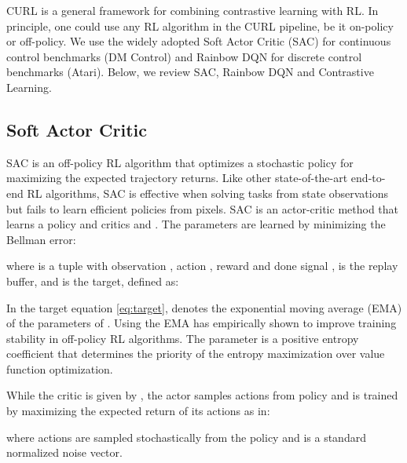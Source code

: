 \documentclass{article}
\begin{document}
CURL is a general framework for combining contrastive learning with RL. In principle, one could use any RL algorithm in the CURL pipeline, be it on-policy or off-policy. We use the widely adopted Soft Actor Critic (SAC) \cite{haarnoja2018soft} for continuous control benchmarks (DM Control) and Rainbow DQN \cite{hessel2017rainbow, van2019use} for discrete control benchmarks (Atari). Below, we review SAC, Rainbow DQN and Contrastive Learning.

\subsection{Soft Actor Critic}

 SAC is an off-policy RL algorithm that optimizes a stochastic policy for maximizing the expected trajectory returns. Like other state-of-the-art end-to-end RL algorithms, SAC is effective when solving tasks from state observations but fails to learn efficient policies from pixels. SAC is an actor-critic method that learns a policy  and critics  and . The parameters  are learned by minimizing the Bellman error:
\vspace{-1mm}


where  is a tuple with observation , action , reward  and done signal ,  is the replay buffer, and  is the target, defined as:



In the target equation \eqref{eq:target},  denotes the exponential moving average (EMA) of the parameters of . Using the EMA has empirically shown to improve training stability in off-policy RL algorithms. The parameter  is a positive entropy coefficient that determines the priority of the entropy maximization over value function optimization. 

While the critic is given by , the actor samples actions from policy  and is trained by maximizing the expected return of its actions as in:



where actions are sampled stochastically from the policy  and  is a standard normalized noise vector. 
\end{document}
